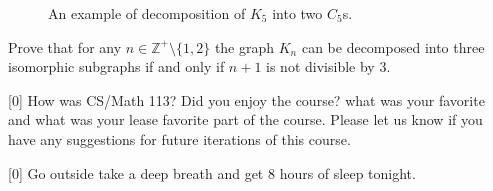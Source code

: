 \documentclass[a4paper]{exam}
\begin{document}
\begin{questions}
\begin{figure}[!h]
\begin{center}
        \end{center}
            \caption{An example of decomposition of $K_5$ into two $C_5$s.}  
            \label{fig:exampl_ahg}     
    \end{figure}
    
    Prove that for any $n\in \mathbb{Z}^+\setminus\{1,2\}$ the graph $K_n$ can be decomposed into three isomorphic subgraphs if and only if $n+1$ is not divisible by 3. 
    \begin{solution}
    \end{solution}

    [0] How was CS/Math 113? Did you enjoy the course? what was your favorite and what was your lease favorite part of the course. Please let us know if you have any suggestions for future iterations of this course.
    \begin{solution}
    \end{solution}

    [0] Go outside take a deep breath and get 8 hours of sleep tonight.
    \begin{solution}
    \end{solution}
    
\end{questions}
\end{document}
